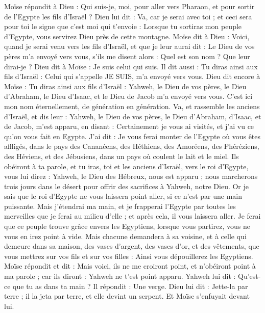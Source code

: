 \begin{multicols}{2}
Moïse répondit à Dieu : Qui suis-je, moi, pour aller vers Pharaon, et pour sortir de l'Egypte les fils d'Israël ?
Dieu lui dit : Va, car je serai avec toi ; et ceci sera pour toi le signe que c’est moi qui t’envoie : Lorsque tu sortiras mon peuple d'Egypte, vous servirez Dieu près de cette montagne.
Moïse dit à Dieu : Voici, quand je serai venu vers les fils d'Israël, et que je leur aurai dit : Le Dieu de vos pères m'a envoyé vers vous, s'ils me disent alors : Quel est son nom ? Que leur dirai-je ?
Dieu dit à Moïse : Je suis celui qui suis. Il dit aussi : Tu diras ainsi aux fils d'Israël : Celui qui s'appelle JE SUIS\FTNT{}, m'a envoyé vers vous.
Dieu dit encore à Moïse : Tu diras ainsi aux fils d'Israël : Yahweh, le Dieu de vos pères, le Dieu d'Abraham, le Dieu d'Isaac, et le Dieu de Jacob m'a envoyé vers vous. C'est ici mon nom éternellement, de génération en génération.
Va, et rassemble les anciens d'Israël, et dis leur : Yahweh, le Dieu de vos pères, le Dieu d'Abraham, d'Isaac, et de Jacob, m'est apparu, en disant : Certainement je vous ai visités, et j'ai vu ce qu'on vous fait en Egypte.
J'ai dit : Je vous ferai monter de l'Egypte où vous êtes affligés, dans le pays des Cananéens, des Héthiens, des Amoréens, des Phéréziens, des Héviens, et des Jébusiens, dans un pays où coulent le lait et le miel.
Ils obéiront à ta parole, et tu iras, toi et les anciens d'Israël, vers le roi d'Egypte, vous lui direz : Yahweh, le Dieu des Hébreux, nous est apparu ; nous marcherons trois jours dans le désert pour offrir des sacrifices à Yahweh, notre Dieu.
Or je sais que le roi d'Egypte ne vous laissera point aller, si ce n’est par une main puissante.
Mais j'étendrai ma main, et je frapperai l'Egypte par toutes les merveilles que je ferai au milieu d'elle ; et après cela, il vous laissera aller.
Je ferai que ce peuple trouve grâce envers les Egyptiens, lorsque vous partirez, vous ne vous en irez point à vide.
Mais chacune demandera à sa voisine, et à celle qui demeure dans sa maison, des vases d'argent, des vases d'or, et des vêtements, que vous mettrez sur vos fils et sur vos filles : Ainsi vous dépouillerez les Egyptiens.
\VerseOne{}Moïse répondit et dit : Mais voici, ils ne me croiront point, et n'obéiront point à ma parole ; car ils diront : Yahweh ne t'est point apparu.
Yahweh lui dit : Qu'est-ce que tu as dans ta main ? Il répondit : Une verge.
Dieu lui dit : Jette-la par terre ; il la jeta par terre, et elle devint un serpent. Et Moïse s'enfuyait devant lui.

\end{multicols}
